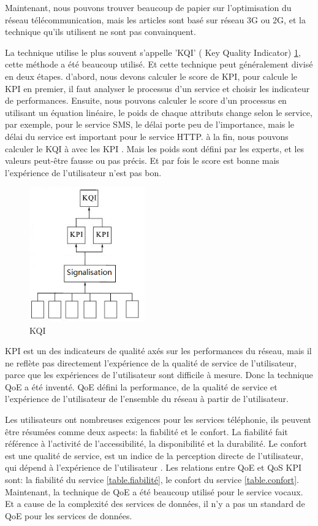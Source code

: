 Maintenant, nous pouvons trouver beaucoup de papier sur l'optimisation du réseau télécommunication, mais les articles sont basé sur réseau 3G ou 2G, et la technique qu'ils utilisent ne sont pas convainquent. 

La technique utilise le plus souvent s'appelle 'KQI' ( Key Quality Indicator) \ref{fig:kqi}, cette méthode a été beaucoup utilisé. Et cette technique peut généralement divisé en deux étapes. d'abord, nous devons calculer le score de KPI, pour calcule le KPI en premier, il faut analyser le processus d'un service et choisir les indicateur de performances. Ensuite, nous pouvons calculer le score d'un processus en utilisant un équation linéaire, le poids de chaque attributs change selon le service, par exemple, pour le service SMS, le délai porte peu de l'importance, mais le délai du service est important pour le service HTTP. \textsf{à} la fin, nous pouvons calculer le KQI à avec les KPI \cite{kqi}. Mais les poids sont défini par les experts, et les valeurs peut-être fausse ou pas précis. Et par fois le score est bonne mais l'expérience de l'utilisateur n'est pas bon.
\begin{figure}[H]
\centering
\includegraphics[width=5cm]{images/kqi}
\caption{KQI}
\label{fig:kqi}
\end{figure}

KPI est un des indicateurs de qualité axés sur les performances du réseau, mais il ne reflète pas directement l'expérience de la qualité de service de l'utilisateur, parce que les expériences de l'utilisateur sont difficile à mesure. Donc la technique QoE a été inventé. QoE défini la performance, de la qualité de service et l'expérience de l'utilisateur de l'ensemble du réseau à partir de l'utilisateur.

Les utilisateurs ont nombreuses exigences pour les services téléphonie, ils peuvent être résumées comme deux aspects: la fiabilité et le confort. La fiabilité fait référence à l'activité de l'accessibilité, la disponibilité et la durabilité. Le confort est une qualité de service, est un indice de la perception directe de l'utilisateur, qui dépend à l'expérience de l'utilisateur \cite{QoE}. Les relations entre QoE et QoS KPI sont: la fiabilité du service \ref{table.fiabilité}, le confort du service \ref{table.confort}. Maintenant, la technique de QoE a été beaucoup utilisé pour le service vocaux. Et a cause de la complexité des services de données, il n'y a pas un standard de QoE pour les services de données. 

